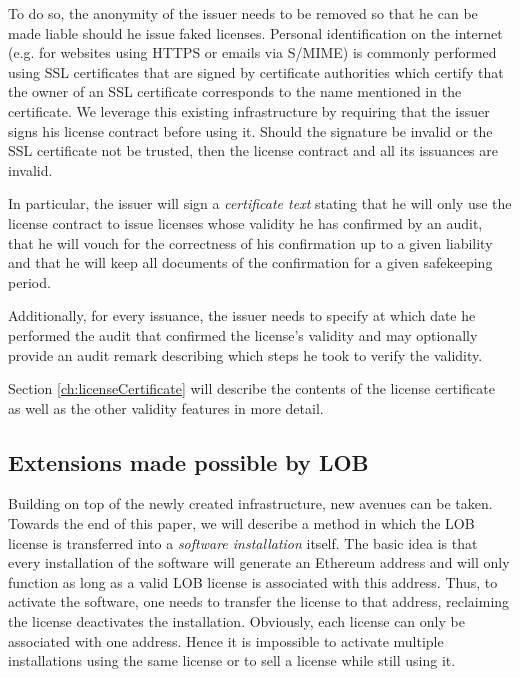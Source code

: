 \documentclass[a4paper]{article}
\begin{document}
To do so, the anonymity of the issuer needs to be removed so that he can be made liable should he issue faked licenses. Personal identification on the internet (e.g. for websites using HTTPS or emails via S/MIME) is commonly performed using SSL certificates that are signed by certificate authorities which certify that the owner of an SSL certificate corresponds to the name mentioned in the certificate.
We leverage this existing infrastructure by requiring that the issuer signs his license contract before using it. Should the signature be invalid or the SSL certificate not be trusted, then the license contract and all its issuances are invalid.

In particular, the issuer will sign a \emph{certificate text} stating that he will only use the license contract to issue licenses whose validity he has confirmed by an audit, that he will vouch for the correctness of his confirmation up to a given liability and that he will keep all documents of the confirmation for a given safekeeping period.

Additionally, for every issuance, the issuer needs to specify at which date he performed the audit that confirmed the license's validity and may optionally provide an audit remark describing which steps he took to verify the validity.

Section \ref{ch:licenseCertificate} will describe the contents of the license certificate as well as the other validity features in more detail.





\subsection{Extensions made possible by LOB}
\label{ch:extensionsOverview}

Building on top of the newly created infrastructure, new avenues can be taken. Towards the end of this paper, we will describe a method in which the LOB license is transferred into a \emph{software installation} itself. The basic idea is that every installation of the software will generate an Ethereum address and will only function as long as a valid LOB license is associated with this address. Thus, to activate the software, one needs to transfer the license to that address, reclaiming the license deactivates the installation. Obviously, each license can only be associated with one address. Hence it is impossible to activate multiple installations using the same license or to sell a license while still using it.
\end{document}
